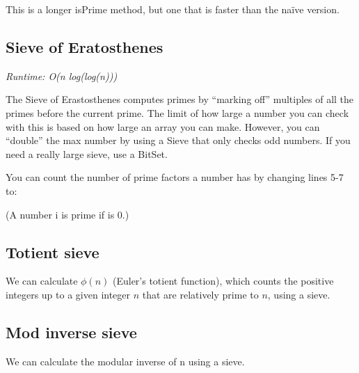 
This is a longer isPrime method, but one that is faster than the naïve version.



\subsection*{Sieve of Eratosthenes}

\textit{Runtime: O(n log(log(n)))}

The Sieve of Erastosthenes computes primes by “marking off” multiples of all the primes before the current prime. The limit of how large a number you can check with this is based on how large an array you can make. However, you can “double” the max number by using a Sieve that only checks odd numbers. If you need a really large sieve, use a BitSet.



You can count the number of prime factors a number has by changing lines 5-7 to:



(A number i is prime if  is 0.)

\subsection*{Totient sieve}

We can calculate $\phi(n)$ (Euler's totient function), which counts the positive integers up to a given integer $n$ that are relatively prime to $n$, using a sieve.



\subsection*{Mod inverse sieve}

We can calculate the modular inverse of n using a sieve.



\newpage